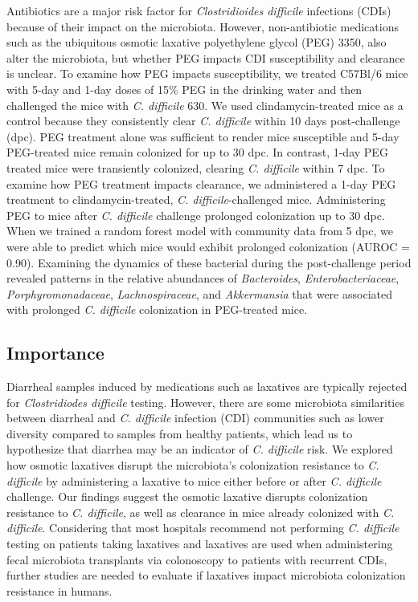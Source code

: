 \documentclass[
  11pt,
]{article}
\begin{document}
Antibiotics are a major risk factor for \emph{Clostridioides difficile}
infections (CDIs) because of their impact on the microbiota. However,
non-antibiotic medications such as the ubiquitous osmotic laxative
polyethylene glycol (PEG) 3350, also alter the microbiota, but whether
PEG impacts CDI susceptibility and clearance is unclear. To examine how
PEG impacts susceptibility, we treated C57Bl/6 mice with 5-day and 1-day
doses of 15\% PEG in the drinking water and then challenged the mice
with \emph{C. difficile} 630. We used clindamycin-treated mice as a
control because they consistently clear \emph{C. difficile} within 10
days post-challenge (dpc). PEG treatment alone was sufficient to render
mice susceptible and 5-day PEG-treated mice remain colonized for up to
30 dpc. In contrast, 1-day PEG treated mice were transiently colonized,
clearing \emph{C. difficile} within 7 dpc. To examine how PEG treatment
impacts clearance, we administered a 1-day PEG treatment to
clindamycin-treated, \emph{C. difficile}-challenged mice. Administering
PEG to mice after \emph{C. difficile} challenge prolonged colonization
up to 30 dpc. When we trained a random forest model with community data
from 5 dpc, we were able to predict which mice would exhibit prolonged
colonization (AUROC = 0.90). Examining the dynamics of these bacterial
during the post-challenge period revealed patterns in the relative
abundances of \emph{Bacteroides}, \emph{Enterobacteriaceae},
\emph{Porphyromonadaceae}, \emph{Lachnospiraceae}, and
\emph{Akkermansia} that were associated with prolonged \emph{C.
difficile} colonization in PEG-treated mice.

\hypertarget{importance}{%
\subsection{Importance}\label{importance}}

Diarrheal samples induced by medications such as laxatives are typically
rejected for \emph{Clostridiodes difficile} testing. However, there are
some microbiota similarities between diarrheal and \emph{C. difficile}
infection (CDI) communities such as lower diversity compared to samples
from healthy patients, which lead us to hypothesize that diarrhea may be
an indicator of \emph{C. difficile} risk. We explored how osmotic
laxatives disrupt the microbiota's colonization resistance to \emph{C.
difficile} by administering a laxative to mice either before or after
\emph{C. difficile} challenge. Our findings suggest the osmotic laxative
disrupts colonization resistance to \emph{C. difficile}, as well as
clearance in mice already colonized with \emph{C. difficile}.
Considering that most hospitals recommend not performing \emph{C.
difficile} testing on patients taking laxatives and laxatives are used
when administering fecal microbiota transplants via colonoscopy to
patients with recurrent CDIs, further studies are needed to evaluate if
laxatives impact microbiota colonization resistance in humans.
\end{document}
